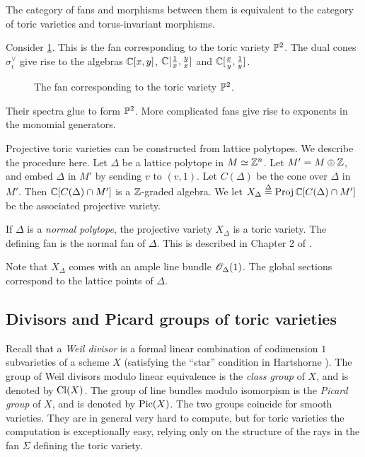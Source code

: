 \begin{remark}
The category of fans and morphisms between them is equivalent to the category of toric varieties and torus-invariant morphisms.
\end{remark}

\begin{example}
Consider \cref{fig:p2fan}. This is the fan corresponding to the toric variety $\P^2$. The dual cones $\sigma_i^\vee$ give rise to the algebras $\C[x,y]$, $\C[\frac 1x, \frac yx]$ and $\C[\frac xy, \frac 1y]$.
\begin{figure}
\centering 

\caption{The fan corresponding to the toric variety $\P^2$.}
\label{fig:p2fan}
\end{figure}
Their spectra glue to form $\P^2$. More complicated fans give rise to exponents in the monomial generators.
\end{example}

Projective toric varieties can be constructed from lattice polytopes. We describe the procedure here. Let $\Delta$ be a lattice polytope in $M \simeq \Z^n$. Let $M' = M \oplus \Z$, and embed $\Delta$ in $M'$ by sending $v$ to $(v,1)$. Let $C(\Delta)$ be the cone over $\Delta$ in $M'$. Then $\C[C(\Delta) \cap M']$ is a $\Z$-graded algebra. We let $X_\Delta \stackrel \Delta = \Proj \C[C(\Delta) \cap M']$ be the associated projective variety.

If $\Delta$ is a \emph{normal polytope}, the projective variety $X_\Delta$ is a toric variety. The defining fan is the normal fan of $\Delta$. This is described in Chapter 2 of \cite{cox_toric}.

Note that $X_\Delta$ comes with an ample line bundle $\OO_\Delta(1)$. The global sections correspond to the lattice points of $\Delta$. 


\subsection{Divisors and Picard groups of toric varieties}

Recall that a \emph{Weil divisor} is a formal linear combination of codimension $1$ subvarieties of a scheme $X$ (satisfying the ``star'' condition in Hartshorne \cite{hartshorne}). The group of Weil divisors modulo linear equivalence is the \emph{class group} of $X$, and is denoted by $\Cl(X)$. The group of line bundles modulo isomorpism is the \emph{Picard group} of $X$, and is denoted by $\Pic(X)$. The two groups coincide for smooth varieties. They are in general very hard to compute, but for toric varieties the computation is exceptionally easy, relying only on the structure of the rays in the fan $\Sigma$ defining the toric variety.

